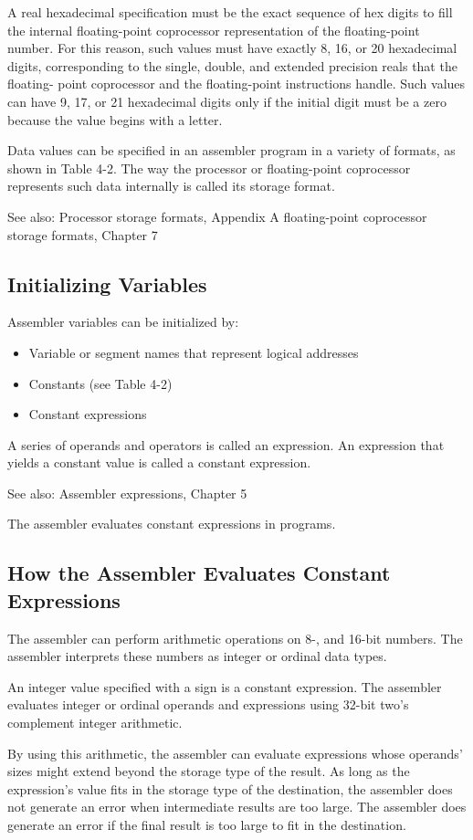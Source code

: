A real hexadecimal specification must be the exact sequence of hex digits to fill the internal floating-point coprocessor representation of the floating-point number. For this reason, such values must have exactly 8, 16, or 20 hexadecimal digits, corresponding to the single, double, and extended precision reals that the floating- point coprocessor and the floating-point instructions handle. Such values can have 9, 17, or 21 hexadecimal digits only if the initial digit must be a zero because the value begins with a letter.

Data values can be specified in an assembler program in a variety of formats, as shown in Table 4-2. The way the processor or floating-point coprocessor represents such data internally is called its storage format.

See also: Processor storage formats, Appendix A floating-point coprocessor storage formats, Chapter 7

\subsection*{Initializing Variables}
Assembler variables can be initialized by:
\begin{itemize}
\item Variable or segment names that represent logical addresses
\item Constants (see Table 4-2)
\item Constant expressions
\end{itemize}

A series of operands and operators is called an expression. An expression that yields a constant value is called a constant expression.

See also: Assembler expressions, Chapter 5

The assembler evaluates constant expressions in programs.

\subsection*{How the Assembler Evaluates Constant Expressions}
The assembler can perform arithmetic operations on 8-, and 16-bit numbers. The assembler interprets these numbers as integer or ordinal data types.

An integer value specified with a sign is a constant expression. The assembler evaluates integer or ordinal operands and expressions using 32-bit two's complement integer arithmetic.

By using this arithmetic, the assembler can evaluate expressions whose operands' sizes might extend beyond the storage type of the result. As long as the expression's value fits in the storage type of the destination, the assembler does not generate an error when intermediate results are too large. The assembler does generate an error if the final result is too large to fit in the destination.

